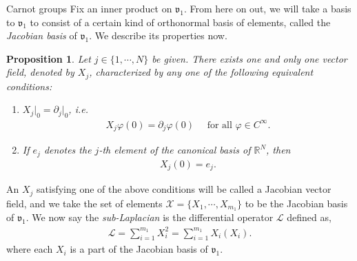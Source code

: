 \documentclass[12pt,a4paper,reqno]{amsart}
\renewcommand{\L}{\mathcal{L}}
\newcommand{\vf}{\mathfrak{v}}
\newcommand{\R}{\mathbb{R}}
\numberwithin{equation}{section}
\newtheorem{prop}[thm]{Proposition}
\theoremstyle{definition}
\begin{document}
\begin{subsection}{Carnot groups}
Fix an inner product on $\vf_1$. From here on out, we will take a basis to $\vf_1$ to consist of a certain kind of orthonormal basis of elements, called the \emph{Jacobian basis} of $\vf_1$. We describe its properties now.
\begin{prop}\cite[Proposition 1.2.16]{BLU}
Let $j \in \{1, \cdots, N\}$ be given. There exists one and only one vector field, denoted by $X_j$, characterized by any one of the following equivalent conditions:
\begin{enumerate}
    \item[(a)]$X_j \vert_{0} = \partial_j \vert_{0}$, i.e. \begin{align*}
        X_j \varphi(0) = \partial_j\varphi(0) \quad \text{ for all }\varphi\in C^{\infty}. 
        \end{align*}
    \item[(ii)] If $e_j$ denotes the $j$-th element of the canonical basis of $\R^N$, then \begin{align*}
    X_j(0)= e_j.
    \end{align*}
\end{enumerate}
\end{prop}

An $X_j$ satisfying one of the above conditions will be called a Jacobian vector field, and we take the set of elements $\mathcal{X} = \{X_1, \cdots, X_{m_1}\}$ to be the Jacobian basis of $\vf_1$. We now say the \emph{sub-Laplacian} is the differential operator $\L$ defined as, \begin{align*}
    \L = \sum_{i=1}^{m_1} X_i^2 = \sum_{i=1}^{m_1} X_i(X_i).
\end{align*}
where each $X_i$ is a part of the Jacobian basis of $\vf_1$.



\end{subsection}
\end{document}
